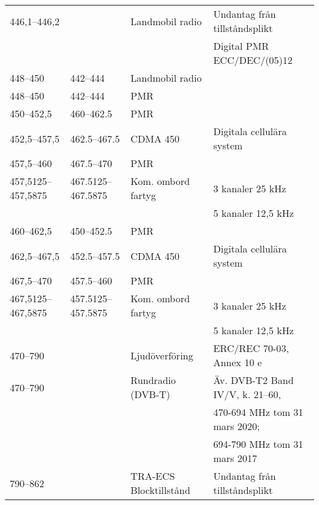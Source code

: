 \documentclass[10pt,swedish,a4paper,twoside]{article}
\begin{document}
\begin{landscape}
\begin{longtable}{llll}
	446,1--446,2       &                    & Landmobil radio                & Undantag från tillståndsplikt       \\
	                   &                    &                                & Digital PMR ECC/DEC/(05)12          \\
	448--450           & 442--444           & Landmobil radio                &  \\
	448--450           & 442--444           & PMR                            &  \\
	450--452,5         & 460--462.5         & PMR                            &  \\
	452,5--457,5       & 462.5--467.5       & CDMA 450                       & Digitala cellulära system           \\
	457,5--460         & 467.5--470         & PMR                            &  \\
	457,5125--457,5875 & 467.5125--467.5875 & Kom. ombord fartyg & 3 kanaler 25 kHz                    \\
	                   &                    &                                & 5 kanaler 12,5 kHz                  \\
	460--462,5         & 450--452.5         & PMR                            &  \\
	462,5--467,5       & 452.5--457.5       & CDMA 450                       & Digitala cellulära system           \\
	467,5--470         & 457.5--460         & PMR                            &  \\
	467,5125--467,5875 & 457.5125--457.5875 & Kom. ombord  fartyg & 3 kanaler 25 kHz                    \\
	                   &                    &                                & 5 kanaler 12,5 kHz                  \\
	470--790           &                    & Ljudöverföring                 & ERC/REC 70-03, Annex 10 e           \\
	470--790           &                    & Rundradio (DVB-T)              & Äv. DVB-T2 Band IV/V, k. 21--60, \\
	                   &                    &                                & 470-694 MHz tom 31 mars 2020;       \\
	                   &                    &                                & 694-790 MHz tom 31 mars 2017        \\
	790--862           &                    & TRA-ECS	Blocktillstånd         & Undantag från tillståndsplikt       \\

\end{longtable}
\end{landscape}
\end{document}
